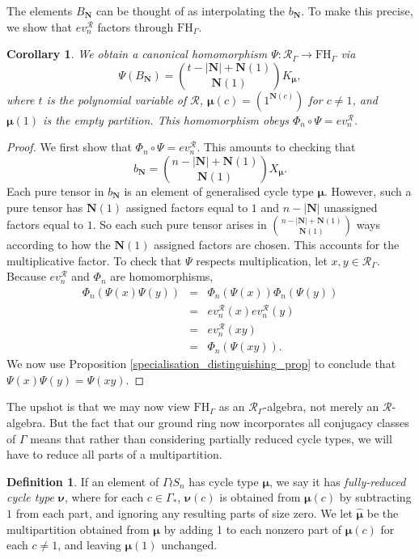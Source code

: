 \documentclass[10pt]{article}
\newtheorem{corollary}[theorem]{Corollary}
\theoremstyle{definition}
\newtheorem{definition}[theorem]{Definition}
\newcommand{\bs}{\boldsymbol}
\newcommand{\RGamma}{\mathcal{R}_{\Gamma}}
\newcommand{\FHG}{\mathrm{FH}_{\Gamma}}
\begin{document}
The elements $B_{\mathbf{N}}$ can be thought of as interpolating the $b_{\mathbf{N}}$. To make this precise, we show that $ev_n^{\mathcal{R}}$ factors through $\FHG$.

\begin{corollary} \label{coeff_compatibility_cor}
We obtain a canonical homomorphism $\Psi: \RGamma \to \FHG$ via
\[
\Psi( B_{\mathbf{N}}) = \binom{t - |\mathbf{N}| + \mathbf{N}(1)}{\mathbf{N}(1)} K_{\bs \mu},
\]
where $t$ is the polynomial variable of $\mathcal{R}$, $\bs \mu(c) = (1^{\mathbf{N}(c)})$ for $c \neq 1$, and $\bs \mu(1)$ is the empty partition. This homomorphism obeys $\Phi_n \circ \Psi = ev_n^{\mathcal{R}}$.
\end{corollary}
\begin{proof}
We first show that $\Phi_n \circ \Psi = ev_n^{\mathcal{R}}$. This amounts to checking that
\[
b_{\mathbf{N}} = \binom{n - |\mathbf{N}| + \mathbf{N}(1)}{\mathbf{N}(1)} X_{\bs \mu}.
\]
Each pure tensor in $b_{\mathbf{N}}$ is an element of generalised cycle type $\bs \mu$. However, such a pure tensor has $\mathbf{N}(1)$ assigned factors equal to $1$ and $n - |\mathbf{N}|$ unassigned factors equal to $1$. So each such pure tensor arises in $\binom{n - |\mathbf{N}| + \mathbf{N}(1)}{\mathbf{N}(1)}$ ways according to how the $\mathbf{N}(1)$ assigned factors are chosen. This accounts for the multiplicative factor. To check that $\Psi$ respects multiplication, let $x,y \in \RGamma$. Because $ev_n^{\mathcal{R}}$ and $\Phi_n$ are homomorphisms,
\begin{eqnarray*}
\Phi_n(\Psi(x)\Psi(y)) &=& \Phi_n(\Psi(x))\Phi_n(\Psi(y)) \\
&=& ev_n^{\mathcal{R}}(x) ev_n^{\mathcal{R}}(y) \\
&=& ev_n^{\mathcal{R}}(xy) \\
&=& \Phi_n(\Psi(xy)).
\end{eqnarray*}
We now use Proposition \ref{specialisation_distinguishing_prop} to conclude that $\Psi(x)\Psi(y) = \Psi(xy)$.
\end{proof}

The upshot is that we may now view $\FHG$ as an $\RGamma$-algebra, not merely an $\mathcal{R}$-algebra. But the fact that our ground ring now incorporates all conjugacy classes of $\Gamma$ means that rather than considering partially reduced cycle types, we will have to reduce all parts of a multipartition.
\begin{definition}
If an element of $\Gamma \wr S_n$ has cycle type $\bs \mu$, we say it has \emph{fully-reduced cycle type} $\bs \nu$, where for each $c \in \Gamma_*$, $\bs \nu(c)$ is obtained from $\bs \mu(c)$ by subtracting $1$ from each part, and ignoring any resulting parts of size zero. We let $\bm\hat{\bs \mu}$ be the multipartition obtained from $\bs \mu$ by adding 1 to each nonzero part of $\bs \mu(c)$ for each $c \neq 1$, and leaving $\bs \mu(1)$ unchanged.
\end{definition}
\end{document}
